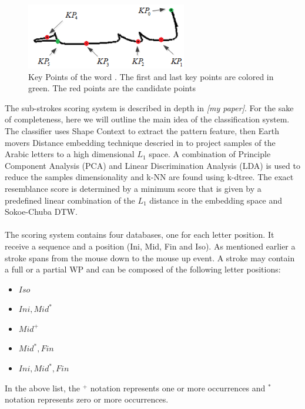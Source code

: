 \documentclass[journal,compsoc]{IEEEtran}
\begin{document}
\begin{figure}
\centering
\includegraphics[width=7cm]{./figures/candidate_points}
\caption{Key Points of the word  . The first and last key points are colored in green. The red points are the candidate points}
\label{fig:candidate_points}
\end{figure}

The sub-strokes scoring system is described in depth in \emph{[my paper]}. For the sake of completeness, here we will outline the main idea of the classification system. The classifier uses Shape Context to extract the pattern feature, then Earth movers Distance embedding technique descried in \cite{shirdhonkar2008approximate} to project samples of the Arabic letters to a high dimensional $L_{1}$ space. A combination of Principle Component Analysis (PCA) and Linear Discrimination Analysis (LDA) is used to reduce the samples dimensionality and k-NN are found using k-dtree. The exact resemblance score is determined by a minimum score that is given by a predefined linear combination of the $L_{1}$ distance in the embedding space and Sokoe-Chuba DTW.\\
\\

The scoring system contains four databases, one for each letter position. It receive a sequence and a position (Ini, Mid, Fin and Iso).
As mentioned earlier a stroke spans from the mouse down to the mouse up event. 
A stroke may contain a full or a partial WP and can be composed of the following letter positions: 
\begin{multicols}{2}
\begin{itemize}
    \item $Iso$
    \item $Ini,Mid^{*}$
    \item $Mid^{+}$    
    \item $Mid^{*},Fin$
    \item $Ini,Mid^{*},Fin$
\end{itemize}
\end{multicols}
In the above list, the $^{+}$ notation represents one or more occurrences and $^{*}$ notation represents zero or more occurrences.
\end{document}
